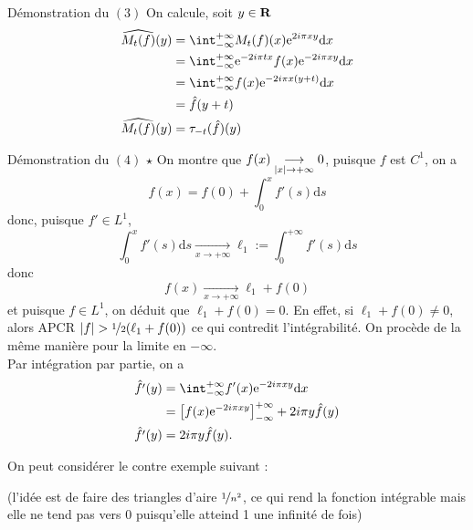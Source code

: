 \documentclass[a4paper,11pt, twoside]{article}
\begin{document}
\begin{ProofC}{Démonstration du $(\mathit 3)$}
  On calcule, soit $y\in\mathbf R$
  \begin{align*}
    \widehat{M_t(f)}(y)&=\intr M_t(f)(x)\ex{2i\pi xy}\dx\\
    &=\intr \ex{-2i\pi tx}f(x)\ex{-2i\pi xy}\dx\\
    &=\intr f(x)\ex{-2i\pi x(y+t)}\dx\\
    &=\hat f(y+t)\\
    \widehat{M_t(f)}(y)&=\tau_{-t}(\hat f)(y)
  \end{align*}
\end{ProofC}


\begin{ProofC}{Démonstration du $(\mathit 4)$}
  $\star$ On montre que $f(x)\underset{\left| x\right|\to+\infty}{\longrightarrow}0$, puisque $f$ est $C^1$, on a 
  $$f(x)=f(0)+\int_0^x f'(s)\mathrm ds$$
  donc, puisque $f'\in L^1$, 
  $$\int_0^x f'(s)\mathrm ds\underset{x\to+\infty}{\longrightarrow}\ell_1:=\int_0^{+\infty}f'(s)\mathrm ds$$
  donc 
  $$f(x)\underset{x\to+\infty}{\longrightarrow}\ell_1+f(0)$$
  et puisque $f\in L^1$, on déduit que $\ell_1+f(0)=0$. En effet, si $\ell_1+f(0)\neq 0$, alors APCR $\abs f>\nicefrac12(\ell_1+f(0))$ ce qui contredit l'intégrabilité. On procède de la même manière pour la limite en $-\infty$.\\

  Par intégration par partie, on a 
  \begin{align*}
    \hat{f'}(y)&=\intr f'(x)\ex{-2i\pi xy}\dx\\
    &=\left[f(x)\ex{-2i\pi xy}\right]_{-\infty}^{+\infty}+2i\pi y\hat f(y)\\
    \hat{f'}(y)&=2i\pi y\hat f(y).
  \end{align*}
\end{ProofC}


On peut considérer le contre exemple suivant :\\
(l'idée est de faire des triangles d'aire $\nicefrac{1}{n^2}$, ce qui rend la fonction intégrable mais elle ne tend pas vers 0 puisqu'elle atteind 1 une infinité de fois)
\end{document}
